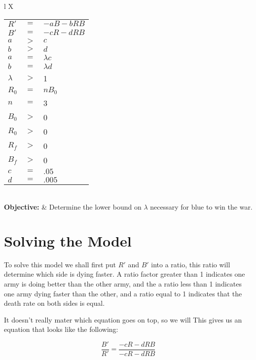 \documentclass[12pt]{report}
\begin{document}
\begin{tabularx}{\linewidth}{ l X}
         \begin{tabulary}{\linewidth}[t]{LLL}
              $R'$&$=$ & $-aB-bRB$\\
              $B'$&$=$&$-cR-dRB$\\
              $a$&$>$&$c$\\
              $b$&$>$&$d$\\
              $a$&$=$&$\lambda c$\\
              $b$&$=$&$\lambda d$\\
              $\lambda$&$>$&1\\
              $R_0$&$=$&$nB_0$\\
              $n$&$=$&3\\
              $B_0$&$>$&0\\
              $R_0$&$>$&0\\
              $R_f$&$>$&0\\
              $B_f$&$>$&0\\
              $c$&$=$&$.05$\\
              $d$&$=$&$.005$\\
              
         \end{tabulary}
         \\
         
         \textbf{Objective:} & Determine the lower bound on $\lambda$ necessary for blue to win the war.\\
         
    \end{tabularx}

\section{Solving the Model}
\hspace{5mm} To solve this model we shall first put $R'$ and $B'$ into a ratio, this ratio will determine which side is dying faster. A ratio factor greater than 1 indicates one army is doing better than the other army, and the a ratio less than 1 indicates one army dying faster than the other, and a ratio equal to 1 indicates that the death rate on both sides is equal.

\hspace{5mm} It doesn't really mater which equation goes on top, so we will This gives us an equation that looks like the following:

$$\dfrac{B'}{R'} = \dfrac{-cR-dRB}{-cR-dRB}$$
\end{document}
